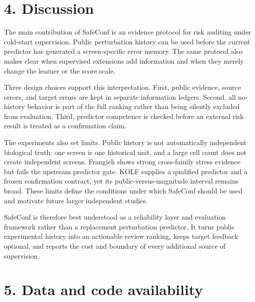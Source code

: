 \documentclass[journal]{IEEEtran}
\begin{document}
\section{4. Discussion}

The main contribution of SafeConf is an evidence protocol for risk auditing under cold-start supervision. Public perturbation history can be used before the current predictor has generated a screen-specific error memory. The same protocol also makes clear when supervised extensions add information and when they merely change the learner or the score scale.

Three design choices support this interpretation. First, public evidence, source errors, and target errors are kept in separate information ledgers. Second, all no-history behavior is part of the full ranking rather than being silently excluded from evaluation. Third, predictor competence is checked before an external risk result is treated as a confirmation claim.

The experiments also set limits. Public history is not automatically independent biological truth: one screen is one historical unit, and a large cell count does not create independent screens. Frangieh shows strong cross-family stress evidence but fails the upstream predictor gate. KOLF supplies a qualified predictor and a frozen confirmation contract, yet its public-versus-magnitude interval remains broad. These limits define the conditions under which SafeConf should be used and motivate future larger independent studies.

SafeConf is therefore best understood as a reliability layer and evaluation framework rather than a replacement perturbation predictor. It turns public experimental history into an actionable review ranking, keeps target feedback optional, and reports the cost and boundary of every additional source of supervision.

\section{5. Data and code availability}
\end{document}
